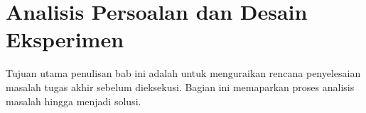 \chapter{Analisis Persoalan dan Desain Eksperimen}
\label{sec:chapter-3}

Tujuan utama penulisan bab ini adalah untuk menguraikan rencana penyelesaian masalah tugas akhir sebelum dieksekusi. Bagian ini  memaparkan proses analisis masalah hingga menjadi solusi.




